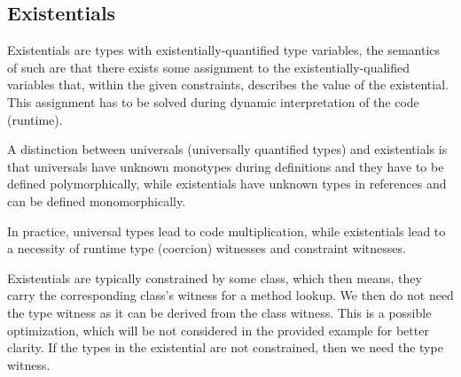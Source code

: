 \subsection{Existentials}

\label{existentials}

Existentials are types with existentially-quantified type variables, the semantics of such are that there exists some assignment to the existentially-qualified variables that, within the given constraints, describes the value of the existential. This assignment has to be solved during dynamic interpretation of the code (runtime).

\begin{remark}
    A distinction between universals (universally quantified types) and existentials is that universals have unknown monotypes during definitions and they have to be defined polymorphically, while existentials have unknown types in references and can be defined monomorphically.
\end{remark}

\begin{remark}
    In practice, universal types lead to code multiplication, while existentials lead to a necessity of runtime type (coercion) witnesses and constraint witnesses.
\end{remark}

Existentials are typically constrained by some class, which then means, they carry the corresponding class's witness for a method lookup. We then do not need the type witness as it can be derived from the class witness. This is a possible optimization, which will be not considered in the provided example for better clarity. If the types in the existential are not constrained, then we need the type witness.

